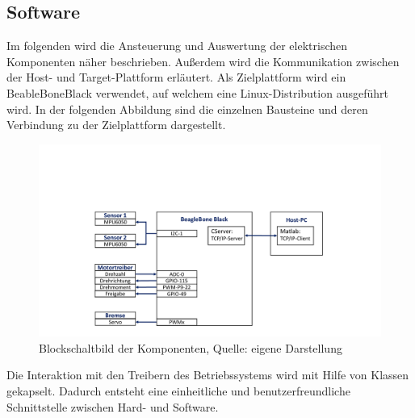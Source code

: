 \subsection{Software}
Im folgenden wird die Ansteuerung und Auswertung der elektrischen Komponenten näher beschrieben. Außerdem wird die Kommunikation zwischen der Host- und Target-Plattform erläutert. Als Zielplattform wird ein BeableBoneBlack verwendet, auf welchem eine Linux-Distribution ausgeführt wird. In der folgenden Abbildung sind die einzelnen Bausteine und deren Verbindung zu der Zielplattform dargestellt.

\begin{figure}[!h]
\centering
\includegraphics[width=0.8\linewidth, trim={4cm 1cm 5cm 6cm},clip]{img/ElekAufbau_Kommunikation}
\caption{Blockschaltbild der Komponenten, Quelle: eigene Darstellung}
\end{figure}

Die Interaktion mit den Treibern des Betriebssystems wird mit Hilfe von Klassen gekapselt. Dadurch entsteht eine einheitliche und benutzerfreundliche Schnittstelle zwischen Hard- und Software.